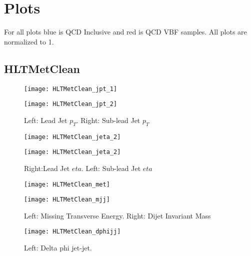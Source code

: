 \documentclass[a4paper,10pt]{article}
\begin{document}
\section{Plots}

For all plots blue is QCD Inclusive and red is QCD VBF samples. All plots are normalized to 1.

\clearpage
\subsection{HLTMetClean}

\begin{figure}[!h]
\centering
\begin{minipage}[!h]{0.4\linewidth}
\centering
\texttt{[image: HLTMetClean\_jpt\_1]}
\end{minipage}%
\begin{minipage}[!h]{0.4\linewidth}
  \texttt{[image: HLTMetClean\_jpt\_2]}
\end{minipage}
\caption{Left: Lead Jet $p_T$. Right: Sub-lead Jet $p_T$}
\end{figure}

\begin{figure}[!h]
\centering
\begin{minipage}[!h]{0.4\linewidth}
\centering
\texttt{[image: HLTMetClean\_jeta\_2]}
\end{minipage}%
\begin{minipage}[!h]{0.4\linewidth}
\centering
\texttt{[image: HLTMetClean\_jeta\_2]}
\end{minipage}
\caption{Right:Lead Jet $eta$. Left: Sub-lead Jet $eta$}
\end{figure}

\begin{figure}[!h]
\centering
\begin{minipage}[!h]{0.4\linewidth}
\centering
\texttt{[image: HLTMetClean\_met]}
\end{minipage}%
\begin{minipage}[!h]{0.4\linewidth}
\centering
\texttt{[image: HLTMetClean\_mjj]}
\end{minipage}
\caption{Left: Missing Transverse Energy. Right: Dijet Invariant Mass}
\end{figure}

\begin{figure}[!h]
\centering
\begin{minipage}[!h]{0.4\linewidth}
\centering
\texttt{[image: HLTMetClean\_dphijj]}
\end{minipage}%
\begin{minipage}[!h]{0.4\linewidth}
\centering
\end{minipage}
\caption{Left: Delta phi jet-jet.}
\end{figure}
\end{document}
